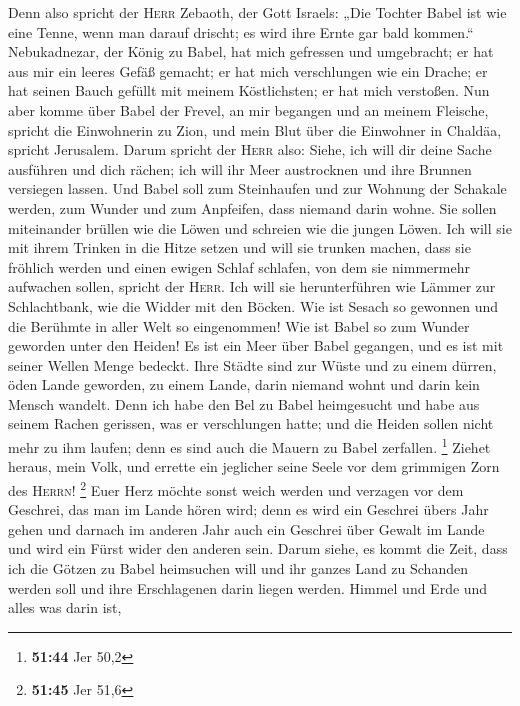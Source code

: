  Denn also spricht der \textsc{Herr} Zebaoth, der Gott
Israels: „Die Tochter Babel ist wie eine Tenne, wenn man darauf drischt;
es wird ihre Ernte gar bald kommen.``  Nebukadnezar, der
König zu Babel, hat mich gefressen und umgebracht; er hat aus mir ein
leeres Gefäß gemacht; er hat mich verschlungen wie ein Drache; er hat
seinen Bauch gefüllt mit meinem Köstlichsten; er hat mich verstoßen.
 Nun aber komme über Babel der Frevel, an mir begangen
und an meinem Fleische, spricht die Einwohnerin zu Zion, und mein Blut
über die Einwohner in Chaldäa, spricht Jerusalem.  Darum
spricht der \textsc{Herr} also: Siehe, ich will dir deine Sache
ausführen und dich rächen; ich will ihr Meer austrocknen und ihre
Brunnen versiegen lassen.  Und Babel soll zum Steinhaufen
und zur Wohnung der Schakale werden, zum Wunder und zum Anpfeifen, dass
niemand darin wohne.  Sie sollen miteinander brüllen wie
die Löwen und schreien wie die jungen Löwen.  Ich will
sie mit ihrem Trinken in die Hitze setzen und will sie trunken machen,
dass sie fröhlich werden und einen ewigen Schlaf schlafen, von dem sie
nimmermehr aufwachen sollen, spricht der \textsc{Herr}. 
Ich will sie herunterführen wie Lämmer zur Schlachtbank, wie die Widder
mit den Böcken.  Wie ist Sesach so gewonnen und die
Berühmte in aller Welt so eingenommen! Wie ist Babel so zum Wunder
geworden unter den Heiden!  Es ist ein Meer über Babel
gegangen, und es ist mit seiner Wellen Menge bedeckt. 
Ihre Städte sind zur Wüste und zu einem dürren, öden Lande geworden, zu
einem Lande, darin niemand wohnt und darin kein Mensch wandelt.
 Denn ich habe den Bel zu Babel heimgesucht und habe aus
seinem Rachen gerissen, was er verschlungen hatte; und die Heiden sollen
nicht mehr zu ihm laufen; denn es sind auch die Mauern zu Babel
zerfallen. \footnote{\textbf{51:44} Jer 50,2}  Ziehet
heraus, mein Volk, und errette ein jeglicher seine Seele vor dem
grimmigen Zorn des \textsc{Herrn}! \footnote{\textbf{51:45} Jer 51,6}
 Euer Herz möchte sonst weich werden und verzagen vor dem
Geschrei, das man im Lande hören wird; denn es wird ein Geschrei übers
Jahr gehen und darnach im anderen Jahr auch ein Geschrei über Gewalt im
Lande und wird ein Fürst wider den anderen sein.  Darum
siehe, es kommt die Zeit, dass ich die Götzen zu Babel heimsuchen will
und ihr ganzes Land zu Schanden werden soll und ihre Erschlagenen darin
liegen werden.  Himmel und Erde und alles was darin ist,
